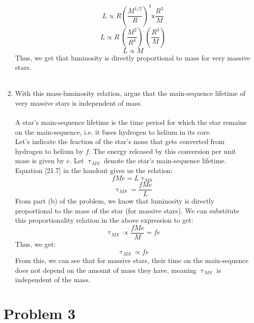 \documentclass[10pt]{article}
\begin{document}
\begin{enumerate}[label=(\alph*)]
    \[ L \propto R \left( \frac{M^{1/2}}{R} \right)^4 \text{x} \frac{R^3}{M}\]
    \[ L \propto R \  (\frac{M^2}{R^4})  \ (\frac{R^3}{M})\]
    \[ L \propto M\]
    Thus, we get that luminosity is directly proportional to mass for very massive stars. \\ \\
    \item With this mass-luminosity relation, argue that the main-sequence lifetime of very massive stars is independent of mass. \\ \\
    A star's main-sequence lifetime is the time period for which the star remains on the main-sequence, i.e. it fuses hydrogen to helium in its core. \\
    Let's indicate the fraction of the star's mass that gets converted from hydrogen to helium by $f$. The energy released by this conversion per unit mass is given by $e$. Let $\uptau_{MS}$ denote the star's main-sequence lifetime. Equation [21.7] in the handout gives us the relation:
    \[ f M e = L \uptau_{MS} \]
    \[ \uptau_{MS} = \frac{f M e}{L}\]
    From part (b) of the problem, we know that luminosity is directly proportional to the mass of the star (for massive stars). We can substitute this proportionality relation in the above expression to get:
    \[ \uptau_{MS} \propto \frac{f M e}{M} = f e \]
    Thus, we get:
    \[ \uptau_{MS} \propto f e \]
    From this, we can see that for massive stars, their time on the main-sequence does not depend on the amount of mass they have, meaning $\uptau_{MS}$ is independent of the mass.
\end{enumerate}

\section*{Problem 3}
\end{document}

